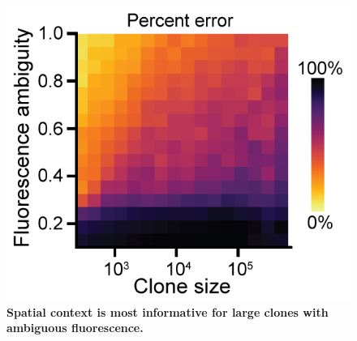 \documentclass[10pt,letterpaper]{article}
\begin{document}
\begin{figure}[h]
\centering
\includegraphics[scale=1]{./figure_S8}
\caption{\textbf{Spatial context is most informative for large clones with ambiguous fluorescence.}}
\end{figure}
\end{document}
